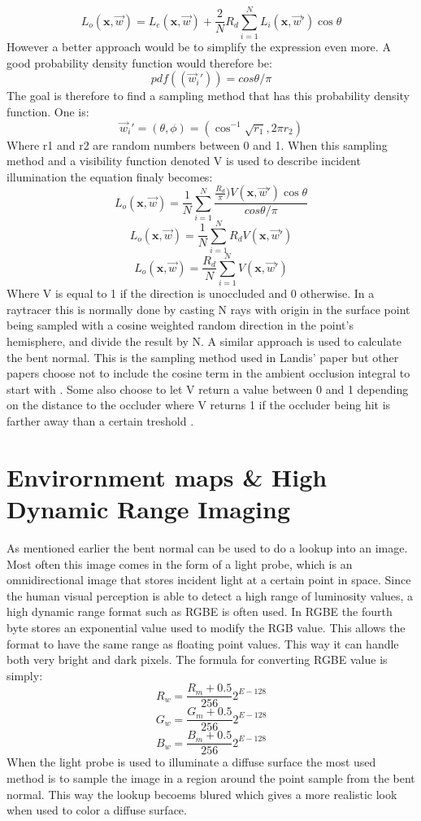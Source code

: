 \[ 
L_o(\textbf{x},\overrightarrow{w}) = 
L_e(\textbf{x},\overrightarrow{w}) + \frac{2}{N} R_d \sum_{i=1}^N L_i(\textbf{x},\overrightarrow{w}')\cos\theta
\]
However a better approach would be to simplify the expression even more. A good probability density function would therefore be\cite{Dutre2001}:
\[
pdf((\overrightarrow{w}_i')) = cos\theta / \pi
\]
The goal is therefore to find a sampling method that has this probability density function. One is\cite{Dutre2001}:
\[
\overrightarrow{w}_i' = (\theta,\phi) =
(\cos^{-1}\sqrt{r_1},2\pi r_2)
\]
Where r1 and r2 are random numbers between 0 and 1.
When this sampling method and a visibility function denoted V is used to describe incident illumination the equation finaly becomes:
\[ 
L_o(\textbf{x},\overrightarrow{w}) = 
\frac{1}{N}
\sum_{i=1}^N \frac{ 
\frac{R_d}{\pi})V(\textbf{x},\overrightarrow{w}')\cos\theta
}
{
cos\theta / \pi
}
\]
\[ 
L_o(\textbf{x},\overrightarrow{w}) = 
\frac{1}{N}
\sum_{i=1}^N
R_d V(\textbf{x},\overrightarrow{w}')
\]
\[ 
L_o(\textbf{x},\overrightarrow{w}) = 
\frac{R_d}{N} \sum_{i=1}^N V(\textbf{x},\overrightarrow{w}')
\]
Where V is equal to 1 if the direction is unoccluded and 0 otherwise. In a raytracer this is normally done by casting N rays with origin in the surface point being sampled with a cosine weighted random direction in the point's hemisphere, and divide the result by N. A similar approach is used to calculate the bent normal. This is the sampling method used in Landis' paper\cite{Landis2002} but other papers choose not to include the cosine term in the ambient occlusion integral to start with \cite{KRES2011}. Some also choose to let V return a value between 0 and 1 depending on the distance to the occluder where V returns 1 if the occluder being hit is farther away than a certain treshold \cite{McGuire:2010}. 
  
\section{Envirornment maps \& High Dynamic Range Imaging}\label{sec:environment_maps}
As mentioned earlier the bent normal can be used to do a lookup into an image. Most often this image comes in the form of a light probe, which is an omnidirectional image that stores incident light at a certain point in space. Since the human visual perception is able to detect a high range of luminosity values, a high dynamic range format such as RGBE is often used. In RGBE the fourth byte stores an exponential value used to modify the RGB value. This allows the format to have the same range as floating point values. This way it can handle both very bright and dark pixels. The formula for converting RGBE value is simply:
\[
R_w = \frac{R_m + 0.5}{256} 2^{E-128} \]\[
G_w = \frac{G_m + 0.5}{256} 2^{E-128} \]\[
B_w = \frac{B_m + 0.5}{256} 2^{E-128} \]\[
\]
When the light probe is used to illuminate a diffuse surface the most used method is to sample the image in a region around the point sample from the bent normal. This way the lookup becoems blured which gives a more realistic look when used to color a diffuse surface\cite{Landis2002}.
